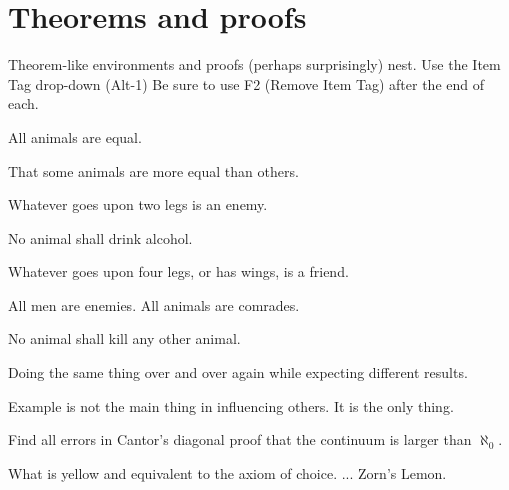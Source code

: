 \section{Theorems and proofs}

Theorem-like environments and proofs (perhaps surprisingly) nest. Use the
Item Tag drop-down (Alt-1) Be sure to use F2 (Remove Item Tag) after the end
of each.

\begin{axiom}
All animals are equal.
\end{axiom}

\begin{claim}
That some animals are more equal than others.
\end{claim}

\begin{conclusion}
Whatever goes upon two legs is an enemy.
\end{conclusion}

\begin{condition}
No animal shall drink alcohol.
\end{condition}

\begin{corollary}
Whatever goes upon four legs, or has wings, is a friend.
\end{corollary}

\begin{conjecture}
All men are enemies. All animals are comrades.
\end{conjecture}

\begin{criterion}
No animal shall kill any other animal.
\end{criterion}

\begin{definition}[Insanity]
Doing the same thing over and over again while expecting different results.
\end{definition}

\begin{example}
Example is not the main thing in influencing others. It is the only thing.
\end{example}

\begin{exercise}
Find all errors in Cantor's diagonal proof that the continuum is larger than 
$\aleph _{0}$.
\end{exercise}

\begin{lemma}
What is yellow and equivalent to the axiom of choice. ... Zorn's Lemon.
\end{lemma}

